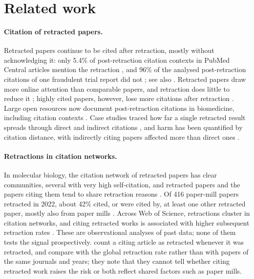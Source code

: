 \section{Related work}\label{sec:related}

\paragraph{Citation of retracted papers.} Retracted papers continue to be cited after retraction, mostly without
acknowledging it: only 5.4\% of post-retraction citation contexts in PubMed Central articles mention the retraction
\citep{hsiao2021continued}, and 96\% of the analysed post-retraction citations of one fraudulent trial report did not
\citep{schneider2020continued}; see also \citet{teixeira2025citation}. Retracted papers draw more online attention than
comparable papers, and retraction does little to reduce it \citep{peng2022attention}; highly cited papers, however,
lose more citations after retraction \citep{memon2025widely}. Large open resources now document post-retraction
citations in biomedicine, including citation contexts \citep{hsiao2021continued,joseph2026sanecite}. Case studies
traced how far a single retracted result spreads through direct and indirect citations
\citep{vandervet2016propagation}, and harm has been quantified by citation distance, with indirectly citing papers
affected more than direct ones \citep{harm2025dynamics}.

\paragraph{Retractions in citation networks.} In molecular biology, the citation network of retracted papers has clear
communities, several with very high self-citation, and retracted papers and the papers citing them tend to share
retraction reasons \citep{feng2024molbio}. Of 416 paper-mill papers retracted in 2022, about 42\% cited, or were cited
by, at least one other retracted paper, mostly also from paper mills \citep{candal2024references}. Across Web of
Science, retractions cluster in citation networks, and citing retracted works is associated with higher subsequent
retraction rates \citep{lou2026beyond}. These are observational analyses of past data; none of them tests the signal
prospectively. \citet{lou2026beyond} count a citing article as retracted whenever it was retracted, and compare
with the global retraction rate rather than with papers of the same journals and years; they note that they cannot
tell whether citing retracted work raises the risk or both reflect shared factors such as paper mills.

